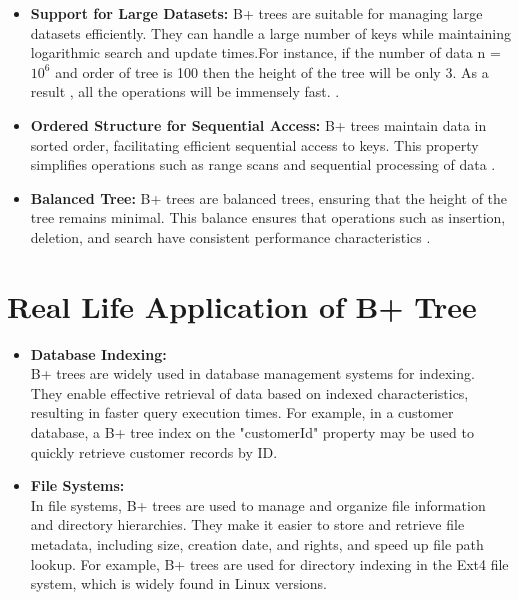 \documentclass{article}
\begin{document}
\begin{itemize}
  \item \textbf{Support for Large Datasets:} B+ trees are suitable for managing large datasets efficiently. They can handle a large number of keys while maintaining logarithmic search and update times.For instance, if the number of data n = $10^6$ and order of tree is 100 then the height of the tree will be only 3. As a result , all the operations will be immensely fast. \cite{oneil1992modern}.
\end{itemize}

\begin{itemize}
  \item \textbf{Ordered Structure for Sequential Access:} B+ trees maintain data in sorted order, facilitating efficient sequential access to keys. This property simplifies operations such as range scans and sequential processing of data \cite{garcia2000database}.
\end{itemize}

\begin{itemize}
  \item \textbf{Balanced Tree:} B+ trees are balanced trees, ensuring that the height of the tree remains minimal. This balance ensures that operations such as insertion, deletion, and search have consistent performance characteristics \cite{bayer1972design}.
\end{itemize}

\section{Real Life Application of B+ Tree}
    \begin{itemize}
        \item \textbf{Database Indexing:}\\B+ trees are widely used in database management systems for indexing. They enable effective retrieval of data based on indexed characteristics, resulting in faster query execution times. For example, in a customer database, a B+ tree index on the "customerId" property may be used to quickly retrieve customer records by ID.
    \end{itemize}

    \begin{itemize}
        \item \textbf{File Systems:}\\In file systems, B+ trees are used to manage and organize file information and directory hierarchies. They make it easier to store and retrieve file metadata, including size, creation date, and rights, and speed up file path lookup. For example, B+ trees are used for directory indexing in the Ext4 file system, which is widely found in Linux versions.
    \end{itemize}
\end{document}
